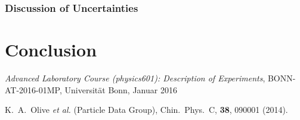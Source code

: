 \documentclass[11pt, a4paper]{article}
\numberwithin{equation}{section}
\begin{document}
\subsubsection{Discussion of Uncertainties}



\section{Conclusion}


\FloatBarrier
\vspace{\fill}
\begin{thebibliography}{19}
	\emph{Advanced Laboratory Course (physics601): Description of Experiments}, BONN-AT-2016-01MP, Universität Bonn, Januar 2016
	
	K.\ A.\ Olive \textit{et al.} (Particle Data Group),
	Chin.\ Phys.\ C, \textbf{38}, 090001 (2014).
\end{thebibliography}
\end{document}
